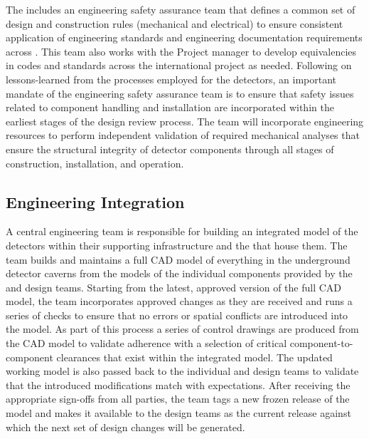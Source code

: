 The  includes an engineering safety assurance team that
defines a common set of design and construction rules (mechanical and
electrical) to ensure consistent application of engineering standards
and engineering documentation requirements across .
This team also works with the Project  manager to develop
equivalencies in codes and standards across the international project
as needed.  Following on lessons-learned from the processes employed
for the  detectors, an important mandate of the
engineering safety assurance team is to ensure that safety issues
related to component handling and installation are incorporated within
the earliest stages of the design review process.  The 
team will incorporate engineering resources to perform independent
validation of required mechanical analyses that ensure the structural
integrity of detector components through all stages of construction,
installation, and operation.

\subsection{Engineering Integration}
\label{sec:dune_engineering}


A central  engineering team is responsible for building an
integrated model of the detectors within their supporting
infrastructure and the  that house them.  The
team builds and maintains a full \threed CAD model of everything in the
underground detector caverns from the models of the individual
components provided by the  and  design teams.
Starting from the latest, approved version of the full CAD model, the
 team incorporates approved changes as they are received
and runs a series of checks to ensure that no errors or spatial
conflicts are introduced into the model.  As part of this process a
series of \twod control drawings are produced from the \threed CAD model to
validate adherence with a selection of critical component-to-component
clearances that exist within the integrated model.  The updated
working model is also passed back to the individual  and
 design teams to validate that the introduced
modifications match with expectations.  After receiving the
appropriate sign-offs from all parties, the  team tags a
new frozen release of the model and makes it available to the design
teams as the current release against which the next set of design
changes will be generated.

